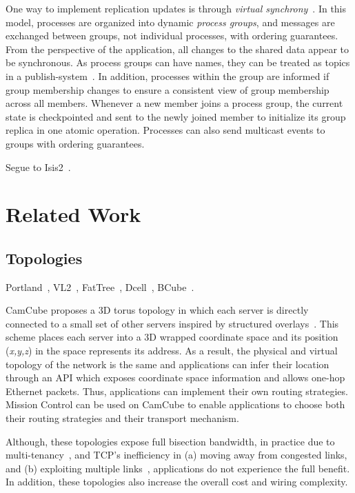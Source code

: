 \documentclass[a4paper,12pt,twoside,openright]{report}
\begin{document}
One way to implement replication updates is through \emph{virtual
synchrony}~\cite{Birman:1987:EVS}. In this model, processes are organized into
dynamic \emph{process groups}, and messages are exchanged between groups, not
individual processes, with ordering guarantees. From the perspective of the
application, all changes to the shared data appear to be synchronous. As process
groups can have names, they can be treated as topics in a
publish-system~\cite{Birman:2010:AHO}. In addition, processes within the group
are informed if group membership changes to ensure a consistent view of group
membership across all members. Whenever a new member joins a process group, the
current state is checkpointed and sent to the newly joined member to initialize
its group replica in one atomic operation. Processes can also send multicast
events to groups with ordering guarantees.

Segue to Isis2~\cite{Birman:2012:OCW}.

\chapter{Related Work}\label{chapter:relatedWork}

\section{Topologies}
Portland~\cite{NiranjanMysore:2009:PSF}, VL2~\cite{Greenberg:2009:VSF},
FatTree~\cite{Al-Fares:2008:SCD}, Dcell~\cite{Guo:2008:DSF},
BCube~\cite{Guo:2009:BHP}.

CamCube proposes a 3D torus topology in which each server is directly connected
to a small set of other servers inspired by structured
overlays~\cite{Abu-Libdeh:2010:SRF}. This scheme places each server into a 3D
wrapped coordinate space and its position (\emph{x,y,z}) in the space represents
its address. As a result, the physical and virtual topology of the network is
the same and applications can infer their location through an API which exposes
coordinate space information and allows one-hop Ethernet packets. Thus,
applications can implement their own routing strategies. Mission Control can be
used on CamCube to enable applications to choose both their routing strategies
and their transport mechanism.

Although, these topologies expose full bisection bandwidth, in practice due to
multi-tenancy~\cite{Costa:2012:CEI}, and TCP's inefficiency in (a) moving away
from congested links, and (b) exploiting multiple links~\cite{Raiciu:2011:IDP},
applications do not experience the full benefit. In addition, these topologies
also increase the overall cost and wiring complexity.
\end{document}
